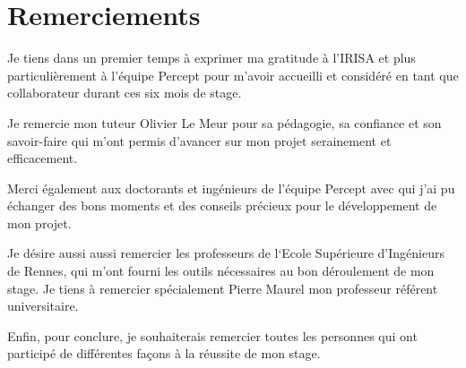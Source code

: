 \chapter*{Remerciements}
\par
    Je tiens dans un premier temps à exprimer ma gratitude à l'IRISA et plus 
    particulièrement à l'équipe Percept pour m'avoir accueilli et considéré en 
    tant que collaborateur durant ces six mois de stage.

\par
    Je remercie mon tuteur Olivier Le Meur pour sa pédagogie, sa confiance et 
    son savoir-faire qui m'ont permis d'avancer sur mon projet serainement et 
    efficacement.

\par
    Merci également aux doctorants et ingénieurs de l'équipe Percept avec qui 
    j'ai pu échanger des bons moments et des conseils précieux pour le 
    développement de mon projet.
    
\par
    Je désire aussi aussi remercier les professeurs de l‘Ecole Supérieure 
    d'Ingénieurs de Rennes, qui m’ont fourni les outils nécessaires au bon 
    déroulement de mon stage. Je tiens à remercier spécialement Pierre Maurel 
    mon professeur référent universitaire.

\par
    Enfin, pour conclure, je souhaiterais remercier toutes les personnes qui ont 
    participé de différentes façons à la réussite de mon stage.
